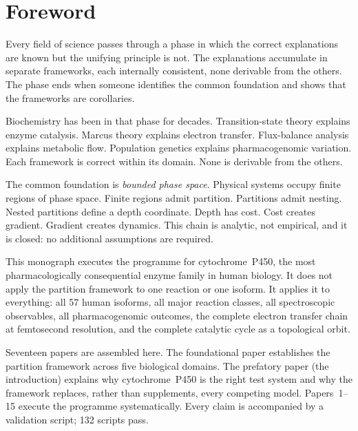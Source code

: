 \documentclass[11pt,a4paper,openany,twoside]{book}
\theoremstyle{definition}
\theoremstyle{remark}
\begin{document}
\cleardoublepage

\chapter*{Foreword}
\pagestyle{fancy}

\noindent Every field of science passes through a phase in which the correct
explanations are known but the unifying principle is not.  The explanations
accumulate in separate frameworks, each internally consistent, none
derivable from the others.  The phase ends when someone identifies the
common foundation and shows that the frameworks are corollaries.

Biochemistry has been in that phase for decades.  Transition-state theory
explains enzyme catalysis.  Marcus theory explains electron transfer.
Flux-balance analysis explains metabolic flow.  Population genetics explains
pharmacogenomic variation.  Each framework is correct within its domain.
None is derivable from the others.

The common foundation is \emph{bounded phase space}.  Physical systems
occupy finite regions of phase space.  Finite regions admit partition.
Partitions admit nesting.  Nested partitions define a depth coordinate.
Depth has cost.  Cost creates gradient.  Gradient creates dynamics.  This
chain is analytic, not empirical, and it is closed: no additional assumptions
are required.

This monograph executes the programme for cytochrome~P450, the most
pharmacologically consequential enzyme family in human biology.  It does not
apply the partition framework to one reaction or one isoform.  It applies it
to everything: all 57 human isoforms, all major reaction classes, all
spectroscopic observables, all pharmacogenomic outcomes, the complete electron
transfer chain at femtosecond resolution, and the complete catalytic cycle as
a topological orbit.

Seventeen papers are assembled here.  The foundational paper establishes the
partition framework across five biological domains.  The prefatory paper
(the introduction) explains why cytochrome~P450 is the right test system and
why the framework replaces, rather than supplements, every competing model.
Papers~1--15 execute the programme systematically.  Every claim is
accompanied by a validation script; 132 scripts pass.
\end{document}
